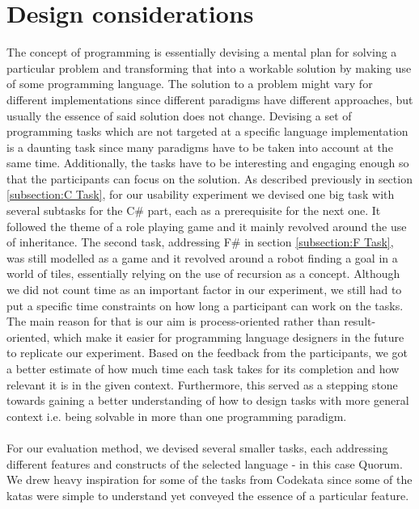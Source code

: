 
\chapter{Design considerations}
The concept of programming is essentially devising a mental plan for solving a particular problem and transforming that into a workable solution by making use of some programming language. The solution to a problem might vary for different implementations since different paradigms have different approaches, but usually the essence of said solution does not change. Devising a set of programming tasks which are not targeted at a specific language implementation is a daunting task since many paradigms have to be taken into account at the same time. Additionally, the tasks have to be interesting and engaging enough so that the participants can focus on the solution. As described previously in section \ref{subsection:C Task}, for our usability experiment we devised one big task with several subtasks for the C\# part, each as a prerequisite for the next one. It followed the theme of a role playing game and it mainly revolved around the use of inheritance. The second task, addressing F\# in section \ref{subsection:F Task}, was still modelled as a game and it revolved around a robot finding a goal in a world of tiles, essentially relying on the use of recursion as a concept. Although we did not count time as an important factor in our experiment, we still had to put a specific time constraints on how long a participant can work on the tasks. The main reason for that is our aim is process-oriented rather than result-oriented, which make it easier for programming language designers in the future to replicate our experiment. Based on the feedback from the participants, we got a better estimate of how much time each task takes for its completion and how relevant it is in the given context. Furthermore, this served as a stepping stone towards gaining a better understanding of how to design tasks with more general context i.e. being solvable in more than one programming paradigm. 
\\\\For our evaluation method, we devised several smaller tasks, each addressing different features and constructs of the selected language - in this case Quorum. We drew heavy inspiration for some of the tasks from Codekata \cite{Codekata} since some of the katas were simple to understand yet conveyed the essence of a particular feature. 

